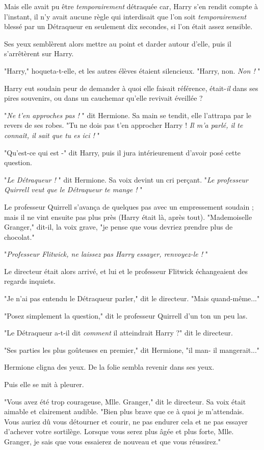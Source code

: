 Mais elle avait pu être \emph{temporairement}  détraquée car, Harry s'en rendit compte à l'instant, il n'y avait aucune règle qui interdisait que l'on soit \emph{temporairement}  blessé par un Détraqueur en seulement dix secondes, si l'on était assez sensible.

Ses yeux semblèrent alors mettre au point et darder autour d'elle, puis il s'arrêtèrent sur Harry.

"Harry," hoqueta-t-elle, et les autres élèves étaient silencieux. "Harry, non. \emph{Non !} "

Harry eut soudain peur de demander à quoi elle faisait référence, était-\emph{il}  dans ses pires souvenirs, ou dans un cauchemar qu'elle revivait éveillée ?

"\emph{Ne t'en approches pas !} " dit Hermione. Sa main se tendit, elle l'attrapa par le revers de ses robes. "Tu ne dois pas t'en approcher Harry ! \emph{Il m'a parlé, il te connaît, il sait que tu es ici !} "

"Qu'est-ce qui est -" dit Harry, puis il jura intérieurement d'avoir posé cette question.

"\emph{Le Détraqueur !} " dit Hermione. Sa voix devint un cri perçant. "\emph{Le professeur Quirrell veut que le Détraqueur te mange !} "

Le professeur Quirrell s'avança de quelques pas avec un empressement soudain ; mais il ne vint ensuite pas plus près (Harry était là, après tout). "Mademoiselle Granger," dit-il, la voix grave, "je pense que vous devriez prendre plus de chocolat."

"\emph{Professeur Flitwick, ne laissez pas Harry essayer, renvoyez-le !} "

Le directeur était alors arrivé, et lui et le professeur Flitwick échangeaient des regards inquiets.

"Je n'ai pas entendu le Détraqueur parler," dit le directeur. "Mais quand-même..."

"Posez simplement la question," dit le professeur Quirrell d'un ton un peu las.

"Le Détraqueur a-t-il dit \emph{comment}  il atteindrait Harry ?" dit le directeur.

"Ses parties les plus goûteuses en premier," dit Hermione, "il man- il mangerait..."

Hermione cligna des yeux. De la folie sembla revenir dans ses yeux.

Puis elle se mit à pleurer.

"Vous avez été trop courageuse, Mlle. Granger," dit le directeur. Sa voix était aimable et clairement audible. "Bien plus brave que ce à quoi je m'attendais. Vous auriez dû vous détourner et courir, ne pas endurer cela et ne pas essayer d'achever votre sortilège. Lorsque vous serez plus âgée et plus forte, Mlle. Granger, je sais que vous essaierez de nouveau et que vous réussirez."

